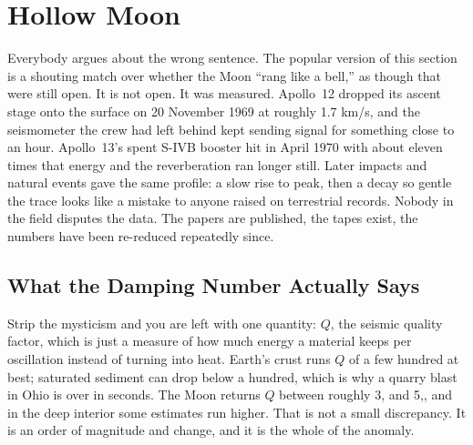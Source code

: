 \section{Hollow Moon}\label{sec:hollowmoon}

Everybody argues about the wrong sentence. The popular version of this section is a shouting match
over whether the Moon ``rang like a bell,'' as though that were still open. It is not open. It was
measured. Apollo~12 dropped its ascent stage onto the surface on 20 November 1969 at roughly 1.7
km/s, and the seismometer the crew had left behind kept sending signal for something close to an
hour. Apollo~13's spent S-IVB booster hit in April 1970 with about eleven times that energy and the
reverberation ran longer still. Later impacts and natural events gave the same profile: a slow rise
to peak, then a decay so gentle the trace looks like a mistake to anyone raised on terrestrial
records. Nobody in the field disputes the data. The papers are published, the tapes exist, the
numbers have been re-reduced repeatedly since.



\subsection{What the Damping Number Actually Says}\label{sec:lunardamping}

Strip the mysticism and you are left with one quantity: $Q$, the seismic quality factor, which is
just a measure of how much energy a material keeps per oscillation instead of turning into heat.
Earth's crust runs $Q$ of a few hundred at best; saturated sediment can drop below a hundred, which
is why a quarry blast in Ohio is over in seconds. The Moon returns $Q$ between roughly 3, and
5,, and in the deep interior some estimates run higher. That is not a small discrepancy. It is
an order of magnitude and change, and it is the whole of the anomaly. 

